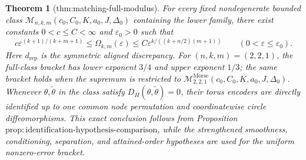 \documentclass{article}
\newtheorem{theorem}{Theorem}
\begin{document}
\begin{theorem}[thm:matching-full-modulus]\label{thm:matching-full-modulus}
For every fixed nondegenerate bounded class \(\mathcal M_{n,k,m}(c_0,C_0,K,a_0,J,\Delta_0)\) containing the lower family, there exist constants \(0<c\leq C<\infty\) and \(\varepsilon_0>0\) such that
\[
c\varepsilon^{(k+1)/(k+m+1)}
\leq \Omega_{k,m}(\varepsilon)
\leq C\varepsilon^{k/((k+n/2)(m+1))}
\qquad (0<\varepsilon\leq\varepsilon_0).
\]
Here \(d_{\mathrm{rep}}\) is the symmetric aligned discrepancy. For \((n,k,m)=(2,2,1)\), the full-class bracket has lower exponent \(3/4\) and upper exponent \(1/3\); the same bracket holds when the supremum is restricted to \(\mathcal M^{\mathrm{Morse}}_{2,2,1}(c_0,C_0,K,a_0,J,\Delta_0)\). Whenever \(\theta,\widetilde\theta\) in the class satisfy \(D_H(\theta,\widetilde\theta)=0\), their torus encoders are directly identified up to one common node permutation and coordinatewise circle diffeomorphisms. This exact conclusion follows from Proposition \(\mathrm{prop:identification\text{-}hypothesis\text{-}comparison}\), while the strengthened smoothness, conditioning, separation, and attained-order hypotheses are used for the uniform nonzero-error bracket.
\end{theorem}
\end{document}

